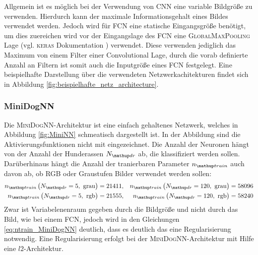 Allgemein ist es möglich bei der Verwendung von CNN eine variable Bildgröße
zu verwenden. Hierdurch kann der maximale Informationsgehalt eines Bildes
verwendet werden. Jedoch wird für FCN eine statische Eingangsgröße benötigt,
um dies zuereichen wird vor der Eingangslage des FCN eine \textsc{GlobalMaxPooling}
Lage (vgl. \textsc{keras} Dokumentation \cite{keras_max_pooling}) verwendet.
Diese verwenden jediglich das Maximum von einem Filter einer Convolutional Lage,
durch die vorab definierte Anzahl an Filtern ist somit auch die Inputgröße eines
FCN festgelegt.
Eine beispielhafte Darstellung über die verwendeten Netzwerkachitekturen findet sich
in Abbildung \ref{fig:beispielhafte_netz_architecture}.

 \subsubsection{MiniDogNN}
 Die \textsc{MiniDogNN}-Architektur ist eine einfach gehaltenes Netzwerk, welches
 in Abbildung \ref{fig:MiniNN} schmeatisch dargestellt ist. In der Abbildung sind
 die Aktivierungsfunktionen nicht mit eingezeichnet. Die Anzahl der Neuronen
 hängt von der Anzahl der Hunderassen $N\ua{dr}$ ab, die klassifiziert werden sollen.
 Darüberhinaus hängt die Anzahl der tranierbaren Parameter $n\ua{train}$ auch davon ab, ob \textsc{RGB} oder
 Graustufen Bilder verwendet werden sollen:
 \begin{align}
   \begin{aligned}
     \label{eq: ntrain_MiniDogNN}
   n\ua{train}\left(N\ua{dr}=5, \,\, \mathrm{grau}\right) &= 21411, & n\ua{train}\left(N\ua{dr}=120, \,\, \mathrm{grau}\right) & = 58096 \\
   n\ua{train}\left(N\ua{dr}=5, \,\, \mathrm{rgb}\right) &= 21555, & n\ua{train}\left(N\ua{dr}=120, \,\, \mathrm{rgb}\right) & = 58240
   \end{aligned}
 \end{align}
 Zwar ist Variabelenenraum gegeben durch die Bildgröße und nicht durch das Bild, wie
 bei einem FCN, jedoch wird in den Gleichungen \eqref{eq:ntrain_MiniDogNN} deutlich,
 dass es deutlich das eine Regularisierung notwendig. Eine Regularisierung
 erfolgt bei der \textsc{MiniDogNN}-Architektur mit Hilfe eine $l2$-Architektur.

